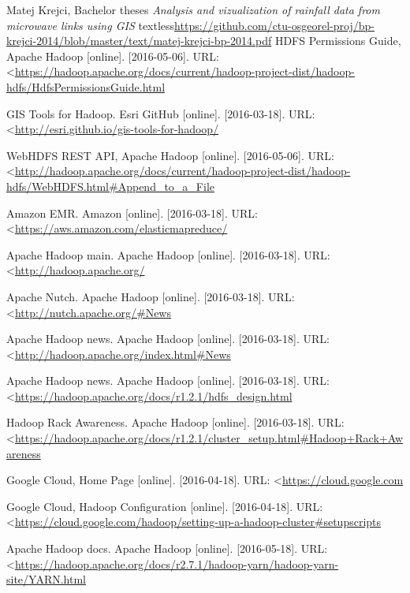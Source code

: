\documentclass[a4paper,12pt,oneside]{report}
\begin{document}
\begin{thebibliography}{99}
		Matej Krejci, Bachelor theses \textit{Analysis and vizualization of rainfall data from microwave links using GIS} 
		textless\url{https://github.com/ctu-osgeorel-proj/bp-krejci-2014/blob/master/text/matej-krejci-bp-2014.pdf}
		HDFS Permissions Guide, Apache Hadoop  [online]. [2016-05-06]. URL: 
		\textless\url{https://hadoop.apache.org/docs/current/hadoop-project-dist/hadoop-hdfs/HdfsPermissionsGuide.html}
		
		GIS Tools for Hadoop. Esri GitHub [online]. [2016-03-18]. URL: 
		\textless\url{http://esri.github.io/gis-tools-for-hadoop/}
		
		WebHDFS REST API, Apache Hadoop  [online]. [2016-05-06]. URL: 
		\textless\url{http://hadoop.apache.org/docs/current/hadoop-project-dist/hadoop-hdfs/WebHDFS.html#Append_to_a_File
		}
		
		Amazon EMR. Amazon [online]. [2016-03-18]. 
		URL: \textless\url{https://aws.amazon.com/elasticmapreduce/}
		
		Apache Hadoop main. Apache Hadoop [online]. [2016-03-18]. 
		URL: \textless\url{http://hadoop.apache.org/}
		
		Apache Nutch. Apache Hadoop [online]. [2016-03-18]. 
		URL: \textless\url{http://nutch.apache.org/#News
		}
		
		Apache Hadoop news. Apache Hadoop [online]. [2016-03-18]. 
		URL: \textless\url{http://hadoop.apache.org/index.html#News}
		
		
		Apache Hadoop news. Apache Hadoop [online]. [2016-03-18]. 
		URL: \textless\url{https://hadoop.apache.org/docs/r1.2.1/hdfs_design.html}
		
		
		Hadoop Rack Awareness. Apache Hadoop [online]. [2016-03-18]. 
		URL:
		\textless\url{https://hadoop.apache.org/docs/r1.2.1/cluster_setup.html#Hadoop+Rack+Awareness}
		
		Google Cloud, Home Page [online]. [2016-04-18]. 
		URL: \textless\url{https://cloud.google.com}
		
		
		Google Cloud, Hadoop Configuration [online]. [2016-04-18]. 
		URL:
		\textless\url{https://cloud.google.com/hadoop/setting-up-a-hadoop-cluster#setupscripts}
		
		Apache Hadoop docs. Apache Hadoop [online]. [2016-05-18]. 
		URL:
		\textless\url{https://hadoop.apache.org/docs/r2.7.1/hadoop-yarn/hadoop-yarn-site/YARN.html}
		

\end{thebibliography}
\end{document}
